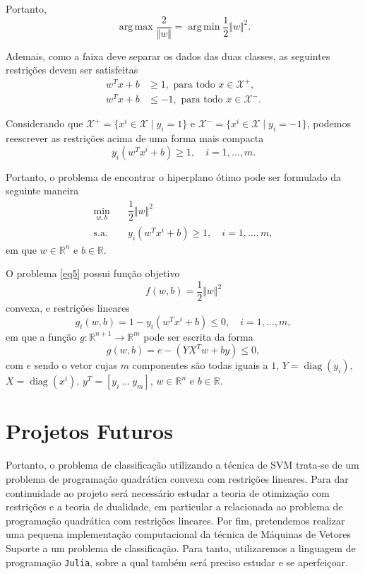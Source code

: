 \documentclass[12pt,a4paper]{scrartcl}
\DeclareMathOperator*{\argmax}{arg\, max}
\DeclareMathOperator*{\argmin}{arg\, min}
\DeclareMathOperator{\diag}{diag}
\def\Xset{\mathcal{X}}
\def\RR{\mathds{R}}
\theoremstyle{definition}%
\begin{document}
Portanto, 
\[ \argmax\dfrac{2}{\Vert w\Vert} = \argmin\dfrac{1}{2}\Vert w\Vert^2. \]

Ademais, como a faixa deve separar os dados das duas classes, as seguintes restrições devem ser satisfeitas
\begin{align}
w^{T}x+b &\geq 1 , \text{ para  todo } x\in \Xset^{+}, \\
w^{T}x+b &\leq -1 , \text{ para  todo } x\in \Xset^{-}.
\end{align}

Considerando que $\Xset^{+}=\{x^i \in \Xset\mid y_i=1\}$ e $\Xset^{-}=\{x^i \in \Xset \mid y_i=-1\}$, podemos reescrever as restrições acima de uma forma mais compacta 
\[ y_{i}(w^{T}x^{i}+b)\geq 1, \quad i=1, \ldots ,m. \]

Portanto, o problema de encontrar o hiperplano ótimo pode ser formulado da seguinte maneira
\[ \label{eq5}
\begin{aligned}
\min_{w,b} & \quad \dfrac{1}{2} \Vert w\Vert^{2} \\
\text{s.a.} &  \quad y_i(w^{T}x^{i}+b) \geq 1, \quad i=1, \ldots , m, \end{aligned}
 \]
em que $w\in \RR^{n}$ e $b\in \RR$. 

O problema \eqref{eq5} possui função objetivo 
\[ f(w,b)=\dfrac{1}{2}\Vert w\Vert^{2} \]
convexa, e restrições lineares
\[ g_i(w,b)=1-y_i(w^{T}x^{i}+b) \leq 0, \quad i=1, \ldots, m, \]
em que a função $g:\RR^{n+1} \rightarrow \RR^{m}$ pode ser escrita da forma 
\[ g(w,b)= e - (YX^{T}w+by) \leq 0, \]
com $e$ sendo o vetor cujas $m$ componentes são todas iguais a $1$, $Y=\diag(y_{i})$, $X=\diag(x^{i})$, $y^{T}=[y_{i} \ \ldots \ y_{m}]$, $w\in \RR^n$ e $b\in \RR$.

\section{Projetos Futuros}
Portanto, o problema de classificação utilizando a técnica de SVM trata-se de um problema de programação quadrática convexa com restrições lineares. Para dar continuidade ao projeto será necessário estudar a teoria de otimização com restrições e a teoria de dualidade, em particular a relacionada ao problema de programação quadrática com restrições lineares. Por fim, pretendemos realizar uma pequena implementação computacional da técnica de Máquinas de Vetores Suporte a um problema de classificação. Para tanto, utilizaremos a linguagem de programação \texttt{Julia}, sobre a qual também será preciso estudar e se aperfeiçoar.


\printbibliography
\end{document}
